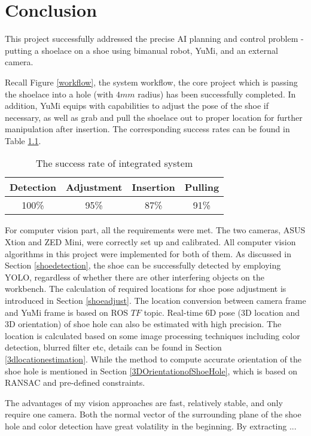 \chapter{Conclusion}

This project successfully addressed the precise AI planning and control problem - putting a shoelace on a shoe using bimanual robot, YuMi, and an external camera. 

Recall Figure \ref{workflow}, the system workflow, the core project which is passing the shoelace into a hole (with $4mm$ radius) has been successfully completed. In addition, YuMi equips with capabilities to adjust the pose of the shoe if necessary, as well as grab and pull the shoelace out to proper location for further manipulation after insertion. The corresponding success rates can be found in Table \ref{sris}.

\begin{table}[H]
\centering
\begin{tabular}{||c|c|c|c||}
\hline
Detection & Adjustment & Insertion & Pulling \\ \hline\hline
100\% & 95\% & 87\% & 91\% \\ \hline
\end{tabular}
\caption{The success rate of integrated system}
\label{sris}
\end{table}

For computer vision part, all the requirements were met. The two cameras, ASUS Xtion and ZED Mini, were correctly set up and calibrated. All computer vision algorithms in this project were implemented for both of them. As discussed in Section \ref{shoedetection}, the shoe can be successfully detected by employing YOLO, regardless of whether there are other interfering objects on the workbench. The calculation of required locations for shoe pose adjustment is introduced in Section \ref{shoeadjust}. The location conversion between camera frame and YuMi frame is based on ROS $TF$ topic. Real-time 6D pose (3D location and 3D orientation) of shoe hole can also be estimated with high precision. The location is calculated based on some image processing techniques including color detection, blurred filter etc, details can be found in Section \ref{3dlocationestimation}. While the method to compute accurate orientation of the shoe hole is mentioned in Section \ref{3DOrientationofShoeHole}, which is based on RANSAC and pre-defined constraints.

The advantages of my vision approaches are fast, relatively stable, and only require one camera. Both the normal vector of the surrounding plane of the shoe hole and color detection have great volatility in the beginning. By extracting ...

